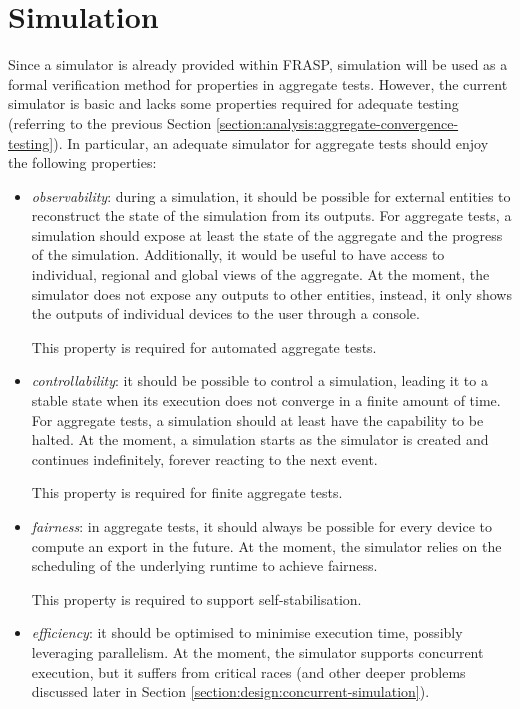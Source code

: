 \section{Simulation}
\label{section:analysis:simulation}

Since a simulator is already provided within FRASP, simulation will be used as
a formal verification method for properties in aggregate tests. However, the
current simulator is basic and lacks some properties required for adequate
testing (referring to the previous Section
\ref{section:analysis:aggregate-convergence-testing}). In particular, an
adequate simulator for aggregate tests should enjoy the following properties:
\begin{itemize}
  \item \textit{observability}: during a simulation, it should be possible for
        external entities to reconstruct the state of the simulation from its
        outputs. For aggregate tests, a simulation should expose at least the
        state of the aggregate and the progress of the simulation. Additionally,
        it would be useful to have access to individual, regional and global
        views of the aggregate. At the moment, the simulator does not expose
        any outputs to other entities, instead, it only shows the outputs of
        individual devices to the user through a console.

        This property is required for automated aggregate tests.
  \item \textit{controllability}: it should be possible to control a
        simulation, leading it to a stable state when its execution does not
        converge in a finite amount of time. For aggregate tests, a simulation
        should at least have the capability to be halted. At the moment, a
        simulation starts as the simulator is created and continues
        indefinitely, forever reacting to the next event.

        This property is required for finite aggregate tests.
  \item \textit{fairness}: in aggregate tests, it should always be possible for
        every device to compute an export in the future. At the moment, the
        simulator relies on the scheduling of the underlying runtime to achieve
        fairness.

        This property is required to support self-stabilisation.
  \item \textit{efficiency}: it should be optimised to minimise execution time,
        possibly leveraging parallelism. At the moment, the simulator supports
        concurrent execution, but it suffers from critical races (and other
        deeper problems discussed later in Section
        \ref{section:design:concurrent-simulation}).


\end{itemize}
